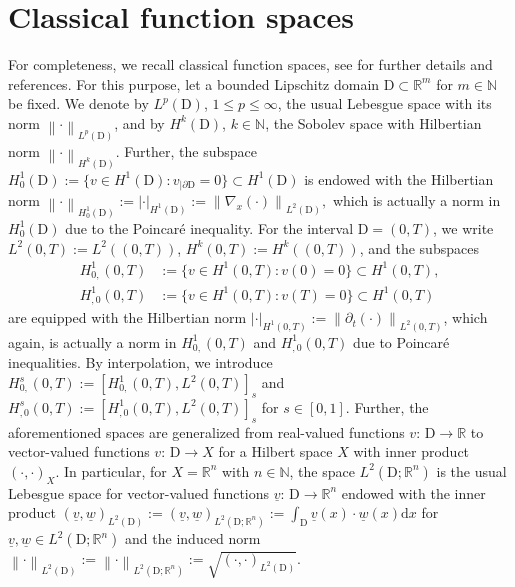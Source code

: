 \documentclass[a4paper,11pt]{article}
\newcommand{\N}{\mathbb N}
\newcommand{\R}{\mathbb R}
\newcommand{\domain}{\mathrm{D}}
\renewcommand{\vec}[1]{\underline{#1}}
\newcommand{\abs}[1]{\left\lvert{#1}\right\rvert}
\newcommand{\norm}[1]{{\left\lVert{#1}\right\rVert}}
\begin{document}
	
\section{Classical function spaces} \label{Sec:FS}
	
	For completeness, we recall classical function spaces, see \cite{Assous2018, ErnGuermond2020I, Monk2003, ZankDissBuch2020} for further details and references. For this purpose, let a bounded Lipschitz domain $\domain \subset \R^m$ for $m \in \N$ be fixed. We denote by $L^p(\domain)$, $1 \leq p \leq \infty$, the usual Lebesgue space with its norm $\norm{\cdot}_{L^p(\domain)}$, and by $H^k(\domain)$, $k \in \N$, the Sobolev space with Hilbertian norm $\norm{\cdot}_{H^k(\domain)}$. Further, the subspace $H^1_0(\domain) := \{ v \in H^1(\domain): v_{|\partial \domain}=0 \} \subset H^1(\domain)$ is endowed with the Hilbertian norm $\norm{\cdot}_{H^1_0(\domain)} := \abs{\cdot}_{H^1(\domain)} := \norm{\nabla_x (\cdot) }_{L^2(\domain)},$ which is actually a norm in $H^1_0(\domain)$ due to the Poincaré inequality.
	For the interval $\domain = (0,T)$, we write $L^2(0,T) := L^2((0,T))$, $H^k(0,T) := H^k((0,T))$, and the subspaces
	\begin{align*}
		H^1_{0,}(0,T) &:= \{ v \in H^1(0,T) : v(0) = 0 \} \subset H^1(0,T), \\
		H^1_{,0}(0,T) &:= \{ v \in H^1(0,T) : v(T) = 0 \} \subset H^1(0,T) 
	\end{align*}
	are equipped with the Hilbertian norm $\abs{\cdot}_{H^1(0,T)} := \norm{\partial_t (\cdot) }_{L^2(0,T)}$, which again, is actually a norm in $H^1_{0,}(0,T)$ and $H^1_{,0}(0,T)$ due to Poincaré inequalities. By interpolation, we introduce $H^s_{0,}(0,T) := [H^1_{0,}(0,T),L^2(0,T)]_s$ and $H^s_{,0}(0,T) := [H^1_{,0}(0,T),L^2(0,T)]_s$
	for $s \in [0,1]$.
	Further, the aforementioned spaces are generalized from real-valued functions $v \colon \, \domain \to \R$ to vector-valued functions $v \colon \, \domain \to X$ for a Hilbert space $X$ with inner product $(\cdot, \cdot)_X$. In particular, for $X = \R^n$ with $n \in \N$, the space $L^2(\domain;\R^n)$ is the usual Lebesgue space for vector-valued functions $\vec v \colon \, \domain \to \R^n$ endowed with the inner product $(\vec v,\vec w)_{L^2(\domain)} := (\vec v, \vec w)_{L^2(\domain;\R^n)}:= \int_\domain \vec v(x) \cdot \vec w(x) \mathrm dx$ for $\vec v, \vec w \in L^2(\domain;\R^n)$ and the induced norm $\norm{\cdot}_{L^2(\domain)} := \norm{\cdot}_{L^2(\domain; \R^n)} := \sqrt{(\cdot,\cdot)_{L^2(\domain)}}$. 
	
\end{document}
